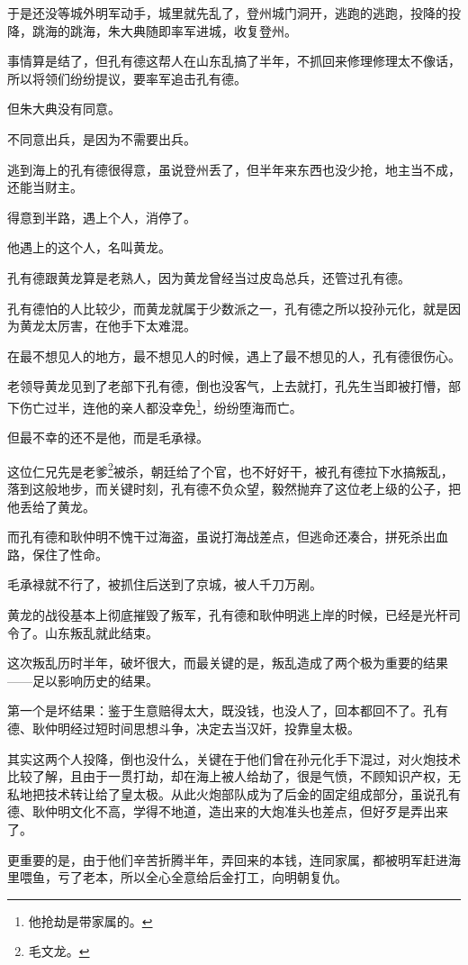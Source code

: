 \begin{multicols}{\theparacolNo}
于是还没等城外明军动手，城里就先乱了，登州城门洞开，逃跑的逃跑，投降的投降，跳海的跳海，朱大典随即率军进城，收复登州。

事情算是结了，但孔有德这帮人在山东乱搞了半年，不抓回来修理修理太不像话，所以将领们纷纷提议，要率军追击孔有德。

但朱大典没有同意。

不同意出兵，是因为不需要出兵。

逃到海上的孔有德很得意，虽说登州丢了，但半年来东西也没少抢，地主当不成，还能当财主。

得意到半路，遇上个人，消停了。

他遇上的这个人，名叫黄龙。

孔有德跟黄龙算是老熟人，因为黄龙曾经当过皮岛总兵，还管过孔有德。

孔有德怕的人比较少，而黄龙就属于少数派之一，孔有德之所以投孙元化，就是因为黄龙太厉害，在他手下太难混。

在最不想见人的地方，最不想见人的时候，遇上了最不想见的人，孔有德很伤心。

老领导黄龙见到了老部下孔有德，倒也没客气，上去就打，孔先生当即被打懵，部下伤亡过半，连他的亲人都没幸免\footnote{他抢劫是带家属的。}，纷纷堕海而亡。

但最不幸的还不是他，而是毛承禄。

这位仁兄先是老爹\footnote{毛文龙。}被杀，朝廷给了个官，也不好好干，被孔有德拉下水搞叛乱，落到这般地步，而关键时刻，孔有德不负众望，毅然抛弃了这位老上级的公子，把他丢给了黄龙。

而孔有德和耿仲明不愧干过海盗，虽说打海战差点，但逃命还凑合，拼死杀出血路，保住了性命。

毛承禄就不行了，被抓住后送到了京城，被人千刀万剐。

黄龙的战役基本上彻底摧毁了叛军，孔有德和耿仲明逃上岸的时候，已经是光杆司令了。山东叛乱就此结束。

这次叛乱历时半年，破坏很大，而最关键的是，叛乱造成了两个极为重要的结果——足以影响历史的结果。

第一个是坏结果：鉴于生意赔得太大，既没钱，也没人了，回本都回不了。孔有德、耿仲明经过短时间思想斗争，决定去当汉奸，投靠皇太极。

其实这两个人投降，倒也没什么，关键在于他们曾在孙元化手下混过，对火炮技术比较了解，且由于一贯打劫，却在海上被人给劫了，很是气愤，不顾知识产权，无私地把技术转让给了皇太极。从此火炮部队成为了后金的固定组成部分，虽说孔有德、耿仲明文化不高，学得不地道，造出来的大炮准头也差点，但好歹是弄出来了。

更重要的是，由于他们辛苦折腾半年，弄回来的本钱，连同家属，都被明军赶进海里喂鱼，亏了老本，所以全心全意给后金打工，向明朝复仇。


\end{multicols}
